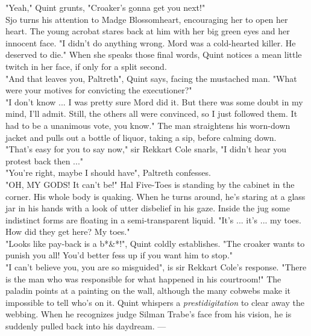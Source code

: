 "Yeah," Quint grunts, "Croaker's gonna get you next!"\\

Sjo turns his attention to Madge Blossomheart, encouraging her to open her heart. The young acrobat stares back at him with her big green eyes and her innocent face. "I didn't do anything wrong. Mord was a cold-hearted killer. He deserved to die." When she speaks those final words, Quint notices a mean little twitch  in her face, if only for a split second.\\

"And that leaves you, Paltreth", Quint says, facing the mustached man. "What were your motives for convicting the executioner?"\\

"I don't know ... I was pretty sure Mord did it. But there was some doubt in my mind, I'll admit. Still, the others all were convinced, so I just followed them. It had to be a unanimous vote, you know." The man straightens his worn-down jacket and pulls out a bottle of liquor, taking a sip, before calming down.\\

"That's easy for you to say now," sir Rekkart Cole snarls, "I didn't hear you protest back then ..."\\

"You're right, maybe I should have", Paltreth confesses.\\

"OH, MY GODS! It can't be!" Hal Five-Toes is standing by the cabinet in the corner. His whole body is quaking. When he turns around, he's staring at a glass jar in his hands with a look of utter disbelief in his gaze. Inside the jug some indistinct forms are floating in a semi-transparent liquid. "It's ... it's ... my toes. How did they get here? My toes."\\

"Looks like pay-back is a b*&*!", Quint coldly establishes. "The croaker wants to punish you all! You'd better fess up if you want him to stop."\\

"I can't believe you, you are so misguided", is sir Rekkart Cole's response. "There is the man who was responsible for what happened in his courtroom!" The paladin points at a painting on the wall, although the many cobwebs make it impossible to tell who's on it. Quint whispers a {\itshape prestidigitation} to clear away the webbing. When he recognizes judge Silman Trabe's face from his vision, he is suddenly pulled back into his daydream. ---\\

